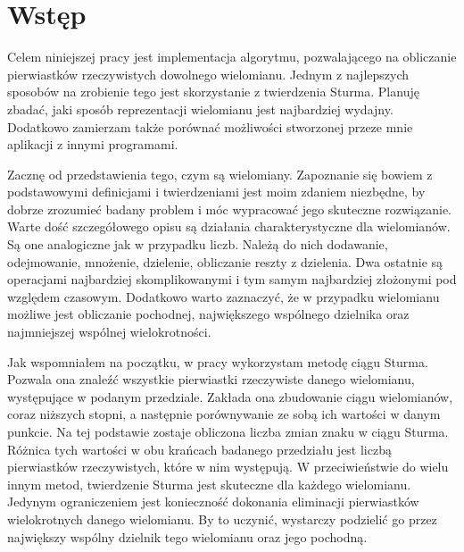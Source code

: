 \chapter{Wstęp}

Celem niniejszej pracy jest implementacja algorytmu, pozwalającego na obliczanie pierwiastków rzeczywistych dowolnego wielomianu. Jednym z najlepszych sposobów na zrobienie tego jest skorzystanie z twierdzenia Sturma. Planuję zbadać, jaki sposób reprezentacji wielomianu jest najbardziej wydajny. Dodatkowo zamierzam także porównać możliwości stworzonej przeze mnie aplikacji z innymi programami.

Zacznę od przedstawienia tego, czym są wielomiany. Zapoznanie się bowiem z podstawowymi definicjami i twierdzeniami jest moim zdaniem niezbędne, by dobrze zrozumieć badany problem i móc wypracować jego skuteczne rozwiązanie. Warte dość szczegółowego opisu są działania charakterystyczne dla wielomianów. Są one analogiczne jak w przypadku liczb. Należą do nich dodawanie, odejmowanie, mnożenie, dzielenie, obliczanie reszty z dzielenia. Dwa ostatnie są operacjami najbardziej skomplikowanymi i tym samym najbardziej złożonymi pod względem czasowym. Dodatkowo warto zaznaczyć, że w przypadku wielomianu możliwe jest obliczanie pochodnej, największego wspólnego dzielnika oraz najmniejszej wspólnej wielokrotności.

Jak wspomniałem na początku, w pracy wykorzystam metodę ciągu Sturma. Pozwala ona znaleźć wszystkie pierwiastki rzeczywiste danego wielomianu, występujące w podanym przedziale. Zakłada ona zbudowanie ciągu wielomianów, coraz niższych stopni, a następnie porównywanie ze sobą ich wartości w danym punkcie. Na tej podstawie zostaje obliczona liczba zmian znaku w ciągu Sturma. Różnica tych wartości w obu krańcach badanego przedziału jest liczbą pierwiastków rzeczywistych, które w nim występują. W przeciwieństwie do wielu innym metod, twierdzenie Sturma jest skuteczne dla każdego wielomianu. Jedynym ograniczeniem jest konieczność dokonania eliminacji pierwiastków wielokrotnych danego wielomianu. By to uczynić, wystarczy podzielić go przez największy wspólny dzielnik tego wielomianu oraz jego pochodną.

